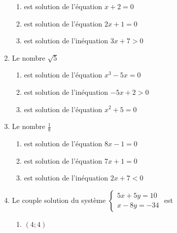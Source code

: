 \documentclass[oneside,twoside]{book}
\begin{document}
\begin{enumerate}
\begin{enumerate}
\item\MauvaiseReponse est solution de l'équation $x+2=0$

\item\MauvaiseReponse est solution de l'équation $2x+1=0$


\item\BonneReponse est solution de l'inéquation $3x+7>0$

\end{enumerate}



\item Le nombre $\sqrt{5}$

\begin{enumerate}


\item\BonneReponse est solution de l'équation $x^{3}-5x=0$

\item\MauvaiseReponse est solution de l'inéquation $-5x+2>0$

\item\MauvaiseReponse est solution de l'équation $x^{2}+5=0$

\end{enumerate}



\item Le nombre $\frac{1}{8}$

\begin{enumerate}


\item\BonneReponse est solution de l'équation $8x-1=0$

\item\MauvaiseReponse est solution de l'équation $7x+1=0$

\item\MauvaiseReponse est solution de l'inéquation $2x+7<0$

\end{enumerate}


\newpage

\item Le couple solution du système $\left\{\begin{array}{c}5x+5y=10 \\ x-8y=-34\end{array}\right.$ est

\begin{enumerate}

\item\MauvaiseReponse $(4;4)$


\end{enumerate}
\end{enumerate}
\end{document}
